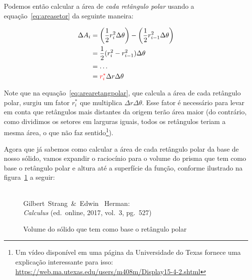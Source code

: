 Podemos então calcular a área de \emph{cada retângulo polar} usando a
equação~\ref{eq:areasetor} da seguinte maneira:

\begin{equation}
  \label{eq:arearetangpolar}
  \begin{split}
    \Delta A_i &= \left(\frac{1}{2} r_i^2\Delta \theta\right) - \left(\frac{1}{2} r_{i-1}^2\Delta \theta\right)\\
               &= \frac{1}{2}(r_i^2 - r_{i-1}^2)\Delta \theta\\
               &= \ldots\\
               &= \color{red}r_i^*\color{black} \Delta r \Delta \theta
  \end{split}
\end{equation}

Note que na equação~\ref{eq:arearetangpolar}, que calcula a área de
cada retângulo polar, surgiu um fator $r_i^*$ que multiplica $\Delta r
\Delta \theta$. Esse fator é necessário para levar em conta que
retângulos mais distantes da origem terão área maior (do contrário,
como dividimos os setores em larguras iguais, todos os retângulos
teriam a mesma área, o que não faz sentido\footnote{Um vídeo
  disponível em uma página da Universidade do Texas fornece uma
  explicação interessante para isso:
  \url{https://web.ma.utexas.edu/users/m408m/Display15-4-2.shtml}}).

Agora que já sabemos como calcular a área de cada retângulo polar da
base de nosso sólido, vamos expandir o raciocínio para o volume do
prisma que tem como base o retângulo polar e altura até a superfície
da função, conforme ilustrado na figura~\ref{fig:prismapolar} a
seguir:

\begin{figure}[H]
  \begin{center}
    \caption{Volume do sólido que tem como base o retângulo polar}
    \label{fig:prismapolar}
    \\
    \footnotesize{Gilbert~Strang~\&~Edwin~ Herman:\\ \emph{Calculus}
        (ed.\ online, 2017, vol.\ 3, pg.\ 527)}
  \end{center}
\end{figure}

